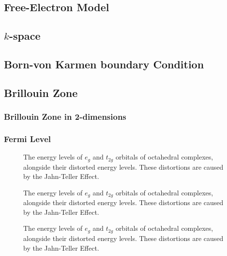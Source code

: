 \documentclass[9pt,twocolumn,twoside]{optica}
\begin{document}
\subsection{Free-Electron Model }

\subsection{$k$-space}

\subsection{Born-von Karmen boundary Condition }

\subsection{Brillouin Zone}

\subsubsection{Brillouin Zone in 2-dimensions}


\subsubsection{Fermi Level}

\begin{figure}[htbp]
\centering
{}
\caption{The energy levels of $e_g$ and $t_{2g}$ orbitals of octahedral complexes, alongside their distorted energy levels. These distortions are caused by the Jahn-Teller Effect.}
\label{fig:Jahn}
\end{figure}


\begin{figure}[htbp]
\centering
{}
\caption{The energy levels of $e_g$ and $t_{2g}$ orbitals of octahedral complexes, alongside their distorted energy levels. These distortions are caused by the Jahn-Teller Effect.}
\label{fig:Jahn}
\end{figure}



\begin{figure}[htbp]
\centering
{}
\caption{The energy levels of $e_g$ and $t_{2g}$ orbitals of octahedral complexes, alongside their distorted energy levels. These distortions are caused by the Jahn-Teller Effect.}
\label{fig:Jahn}
\end{figure}
\end{document}
